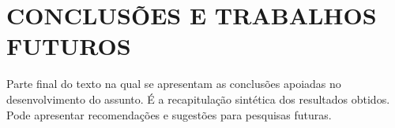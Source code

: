 \chapter{CONCLUSÕES E TRABALHOS FUTUROS}
\label{chap:conclusoes-e-trabalhos-futuros}

Parte final do texto na qual se apresentam as conclusões apoiadas no desenvolvimento do assunto. É a recapitulação sintética dos resultados obtidos. Pode apresentar recomendações e sugestões para pesquisas futuras.











